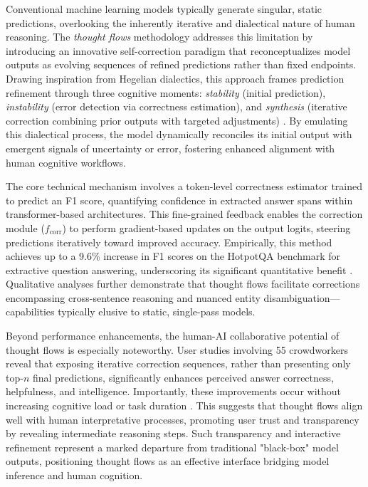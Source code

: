 \documentclass[11pt]{article}
\begin{document}
Conventional machine learning models typically generate singular, static predictions, overlooking the inherently iterative and dialectical nature of human reasoning. The \emph{thought flows} methodology addresses this limitation by introducing an innovative self-correction paradigm that reconceptualizes model outputs as evolving sequences of refined predictions rather than fixed endpoints. Drawing inspiration from Hegelian dialectics, this approach frames prediction refinement through three cognitive moments: \textit{stability} (initial prediction), \textit{instability} (error detection via correctness estimation), and \textit{synthesis} (iterative correction combining prior outputs with targeted adjustments) \cite{ref43}. By emulating this dialectical process, the model dynamically reconciles its initial output with emergent signals of uncertainty or error, fostering enhanced alignment with human cognitive workflows.

The core technical mechanism involves a token-level correctness estimator trained to predict an F1 score, quantifying confidence in extracted answer spans within transformer-based architectures. This fine-grained feedback enables the correction module ($f_{\text{corr}}$) to perform gradient-based updates on the output logits, steering predictions iteratively toward improved accuracy. Empirically, this method achieves up to a 9.6\% increase in F1 scores on the HotpotQA benchmark for extractive question answering, underscoring its significant quantitative benefit \cite{ref43}. Qualitative analyses further demonstrate that thought flows facilitate corrections encompassing cross-sentence reasoning and nuanced entity disambiguation—capabilities typically elusive to static, single-pass models.

Beyond performance enhancements, the human-AI collaborative potential of thought flows is especially noteworthy. User studies involving 55 crowdworkers reveal that exposing iterative correction sequences, rather than presenting only top-$n$ final predictions, significantly enhances perceived answer correctness, helpfulness, and intelligence. Importantly, these improvements occur without increasing cognitive load or task duration \cite{ref43}. This suggests that thought flows align well with human interpretative processes, promoting user trust and transparency by revealing intermediate reasoning steps. Such transparency and interactive refinement represent a marked departure from traditional "black-box" model outputs, positioning thought flows as an effective interface bridging model inference and human cognition.
\end{document}
